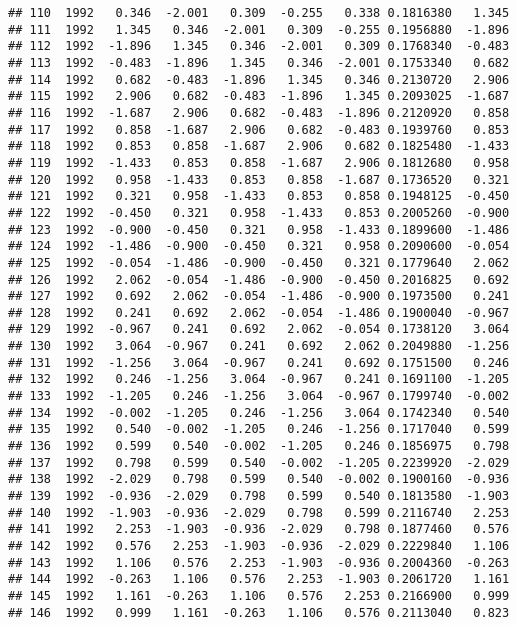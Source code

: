 \documentclass[]{article}
\begin{document}
\begin{verbatim}
## 110  1992   0.346  -2.001   0.309  -0.255   0.338 0.1816380   1.345
## 111  1992   1.345   0.346  -2.001   0.309  -0.255 0.1956880  -1.896
## 112  1992  -1.896   1.345   0.346  -2.001   0.309 0.1768340  -0.483
## 113  1992  -0.483  -1.896   1.345   0.346  -2.001 0.1753340   0.682
## 114  1992   0.682  -0.483  -1.896   1.345   0.346 0.2130720   2.906
## 115  1992   2.906   0.682  -0.483  -1.896   1.345 0.2093025  -1.687
## 116  1992  -1.687   2.906   0.682  -0.483  -1.896 0.2120920   0.858
## 117  1992   0.858  -1.687   2.906   0.682  -0.483 0.1939760   0.853
## 118  1992   0.853   0.858  -1.687   2.906   0.682 0.1825480  -1.433
## 119  1992  -1.433   0.853   0.858  -1.687   2.906 0.1812680   0.958
## 120  1992   0.958  -1.433   0.853   0.858  -1.687 0.1736520   0.321
## 121  1992   0.321   0.958  -1.433   0.853   0.858 0.1948125  -0.450
## 122  1992  -0.450   0.321   0.958  -1.433   0.853 0.2005260  -0.900
## 123  1992  -0.900  -0.450   0.321   0.958  -1.433 0.1899600  -1.486
## 124  1992  -1.486  -0.900  -0.450   0.321   0.958 0.2090600  -0.054
## 125  1992  -0.054  -1.486  -0.900  -0.450   0.321 0.1779640   2.062
## 126  1992   2.062  -0.054  -1.486  -0.900  -0.450 0.2016825   0.692
## 127  1992   0.692   2.062  -0.054  -1.486  -0.900 0.1973500   0.241
## 128  1992   0.241   0.692   2.062  -0.054  -1.486 0.1900040  -0.967
## 129  1992  -0.967   0.241   0.692   2.062  -0.054 0.1738120   3.064
## 130  1992   3.064  -0.967   0.241   0.692   2.062 0.2049880  -1.256
## 131  1992  -1.256   3.064  -0.967   0.241   0.692 0.1751500   0.246
## 132  1992   0.246  -1.256   3.064  -0.967   0.241 0.1691100  -1.205
## 133  1992  -1.205   0.246  -1.256   3.064  -0.967 0.1799740  -0.002
## 134  1992  -0.002  -1.205   0.246  -1.256   3.064 0.1742340   0.540
## 135  1992   0.540  -0.002  -1.205   0.246  -1.256 0.1717040   0.599
## 136  1992   0.599   0.540  -0.002  -1.205   0.246 0.1856975   0.798
## 137  1992   0.798   0.599   0.540  -0.002  -1.205 0.2239920  -2.029
## 138  1992  -2.029   0.798   0.599   0.540  -0.002 0.1900160  -0.936
## 139  1992  -0.936  -2.029   0.798   0.599   0.540 0.1813580  -1.903
## 140  1992  -1.903  -0.936  -2.029   0.798   0.599 0.2116740   2.253
## 141  1992   2.253  -1.903  -0.936  -2.029   0.798 0.1877460   0.576
## 142  1992   0.576   2.253  -1.903  -0.936  -2.029 0.2229840   1.106
## 143  1992   1.106   0.576   2.253  -1.903  -0.936 0.2004360  -0.263
## 144  1992  -0.263   1.106   0.576   2.253  -1.903 0.2061720   1.161
## 145  1992   1.161  -0.263   1.106   0.576   2.253 0.2166900   0.999
## 146  1992   0.999   1.161  -0.263   1.106   0.576 0.2113040   0.823

\end{verbatim}
\end{document}
